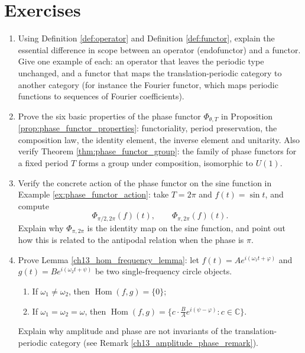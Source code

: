 \section*{Exercises}

\begin{enumerate}[leftmargin=3em, label=\textbf{Exercise \arabic*}]
    \item Using Definition \ref{def:operator} and Definition \ref{def:functor},
    explain the essential difference in scope between an operator (endofunctor) and a functor.
    Give one example of each: an operator that leaves the periodic type unchanged,
    and a functor that maps the translation-periodic category to another category (for instance the Fourier functor, which maps periodic functions to sequences of Fourier coefficients).

    \item Prove the six basic properties of the phase functor
    $\Phi_{\theta,T}$ in Proposition \ref{prop:phase_functor_properties}:
    functoriality, period preservation, the composition law, the identity element, the inverse element and unitarity.
    Also verify Theorem \ref{thm:phase_functor_group}:
    the family of phase functors for a fixed period $T$ forms a group under composition, isomorphic to $U(1)$.

    \item Verify the concrete action of the phase functor on the sine function in Example \ref{ex:phase_functor_action}:
    take $T=2\pi$ and $f(t)=\sin t$, and compute
    \[
    \Phi_{\pi/2,2\pi}(f)(t),\qquad
    \Phi_{\pi,2\pi}(f)(t).
    \]
    Explain why $\Phi_{\pi,2\pi}$ is the identity map on the sine function,
    and point out how this is related to the antipodal relation when the phase is $\pi$.

    \item Prove Lemma \ref{ch13_hom_frequency_lemma}:
    let $f(t)=Ae^{i(\omega_1t+\varphi)}$ and $g(t)=Be^{i(\omega_2t+\psi)}$ be two single-frequency circle objects.
    \begin{enumerate}[label=(\roman*)]
        \item If $\omega_1\neq\omega_2$, then $\operatorname{Hom}(f,g)=\{0\}$;
        \item If $\omega_1=\omega_2=\omega$, then
              $\operatorname{Hom}(f,g)=\{c\cdot\frac{B}{A}e^{i(\psi-\varphi)}:c\in\mathbb{C}\}$.
    \end{enumerate}
    Explain why amplitude and phase are not invariants of the translation-periodic category
    (see Remark \ref{ch13_amplitude_phase_remark}).


\end{enumerate}
